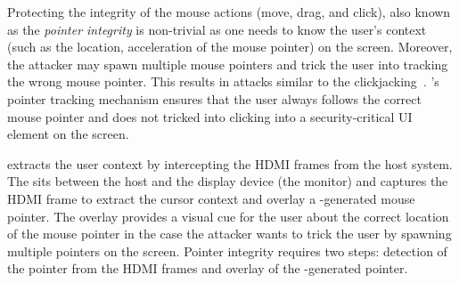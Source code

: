 
Protecting the integrity of the mouse actions (move, drag, and click), also known as the \emph{pointer integrity} is non-trivial as one needs to know the user's context (such as the location, acceleration of the mouse pointer) on the screen. Moreover, the attacker may spawn multiple mouse pointers and trick the user into tracking the wrong mouse pointer. This results in attacks similar to the clickjacking~\cite{huang2012clickjacking}. \name's pointer tracking mechanism ensures that the user always follows the correct mouse pointer and does not tricked into clicking into a security-critical UI element on the screen.

\name extracts the user context by intercepting the HDMI frames from the host system. The \device sits between the host and the display device (the monitor) and captures the HDMI frame to extract the cursor context and overlay a \device-generated mouse pointer. The overlay provides a visual cue for the user about the correct location of the mouse pointer in the case the attacker wants to trick the user by spawning multiple pointers on the screen. Pointer integrity requires two steps: detection of the pointer from the HDMI frames and overlay of the \device-generated pointer.

